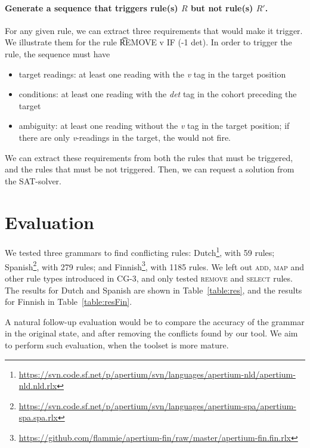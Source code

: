 \paragraph{Generate a sequence that triggers rule(s) $R$ but not rule(s) $R'$.}
For any given rule, we can extract three requirements that would make it trigger. We illustrate them for the rule \t{REMOVE v IF (-1 det)}. In order to trigger the rule, the sequence must have
\begin{itemize}
\item target readings: at least one reading with the \emph{v} tag in the target position
\item conditions: at least one reading with the \emph{det} tag in the cohort preceding the target
\item ambiguity: at least one reading without the \emph{v} tag in the target position; if there are only \emph{v}-readings in the target, the would not fire.
\end{itemize}

We can extract these requirements from both the rules that must be triggered, and the rules that must be not triggered. Then, we can request a solution from the SAT-solver.

\section{Evaluation}
\label{sec:eval}

We tested three grammars to find conflicting rules: 
Dutch\footnote{\scriptsize{\url{https://svn.code.sf.net/p/apertium/svn/languages/apertium-nld/apertium-nld.nld.rlx}}},
with 59 rules; 
Spanish\footnote{\scriptsize{\url{https://svn.code.sf.net/p/apertium/svn/languages/apertium-spa/apertium-spa.spa.rlx}}},
with 279 rules; and 
Finnish\footnote{\scriptsize{\url{https://github.com/flammie/apertium-fin/raw/master/apertium-fin.fin.rlx}}},
with 1185 rules. We left out \textsc{add}, \textsc{map} and other rule
types introduced in CG-3, and only tested \textsc{remove} and \textsc{select} rules.
The results for Dutch and Spanish are shown in Table~\ref{table:res},
and the results for Finnish in Table~\ref{table:resFin}.

A natural follow-up evaluation would be to compare the accuracy of the
grammar in the original state, and after removing the conflicts found
by our tool. We aim to perform such evaluation, when the toolset is more mature.




